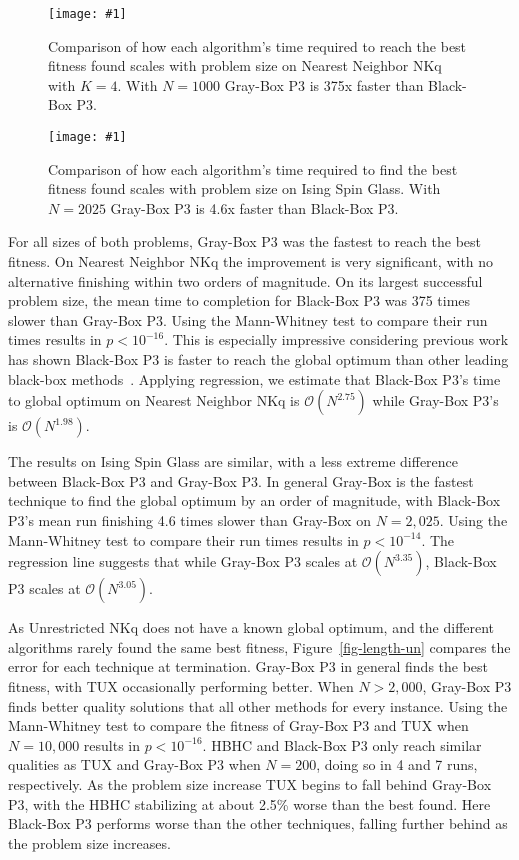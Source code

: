 \documentclass{sig-alternate}
\newcommand{\includegraphicsfit}[1]
{\texttt{[image: \#1]}}
\newcommand{\BigO}[1]{$\mathcal{O}{(#1)}$}
\begin{document}
\begin{figure}
  \centering
  \includegraphicsfit{length-nn}
  \caption{Comparison of how each algorithm's time required to reach the best fitness found scales with problem size
  on Nearest Neighbor NKq with $K=4$. With $N=1000$ Gray-Box P3 is 375x faster than Black-Box P3.}
  \label{fig-length-nn}
\end{figure}

\begin{figure}
  \centering
  \includegraphicsfit{length-is}
  \caption{Comparison of how each algorithm's time required to find the best fitness found scales with problem size
  on Ising Spin Glass. With $N=2025$ Gray-Box P3 is 4.6x faster than Black-Box P3.}
  \label{fig-length-is}
\end{figure}

For all sizes of both problems, Gray-Box P3 was the fastest to reach the best fitness. On
Nearest Neighbor NKq the improvement is very significant, with no alternative finishing within
two orders of magnitude. On its largest successful problem size, the mean time to completion for
Black-Box P3 was 375 times slower than Gray-Box P3. Using the Mann-Whitney test to compare their run times
results in $p < 10^{-16}$. This is especially impressive considering
previous work has shown Black-Box P3 is faster to reach the global optimum than other leading black-box
methods~\cite{goldman:2015:fastp3}. Applying regression, we estimate that Black-Box P3's time to global optimum
on Nearest Neighbor NKq is \BigO{N^{2.75}} while Gray-Box P3's is \BigO{N^{1.98}}.

The results on Ising Spin Glass are similar, with a less extreme difference between
Black-Box P3 and Gray-Box P3. In general Gray-Box is the fastest technique to
find the global optimum by an order of magnitude, with Black-Box P3's mean run finishing
4.6 times slower than Gray-Box on $N=2,025$. Using the Mann-Whitney test to compare their run times
results in $p < 10^{-14}$. The regression line suggests that while
Gray-Box P3 scales at \BigO{N^{3.35}}, Black-Box P3 scales at \BigO{N^{3.05}}.

As Unrestricted NKq does not have a known global optimum, and the different algorithms
rarely found the same best fitness, Figure~\ref{fig-length-un} compares the error
for each technique at termination. Gray-Box P3 in general finds the best fitness,
with TUX occasionally performing better. When $N>2,000$, Gray-Box P3 finds better quality
solutions that all other methods for every instance.  Using the Mann-Whitney test to compare the fitness
of Gray-Box P3 and TUX when $N=10,000$ results in $p < 10^{-16}$. HBHC and Black-Box P3 only reach similar
qualities as TUX and Gray-Box P3 when $N=200$, doing so in 4 and 7 runs, respectively. As the problem
size increase TUX begins to fall behind Gray-Box P3, with the HBHC stabilizing at about 2.5\% worse than
the best found. Here Black-Box P3 performs worse than the other techniques,
falling further behind as the problem size increases.
\end{document}
